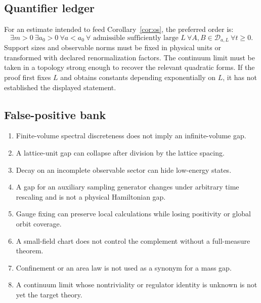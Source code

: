 \normalsize

\subsection{Quantifier ledger}

For an estimate intended to feed Corollary~\ref{cor:os}, the preferred order
is:
\[
 \exists m>0\ \exists a_0>0\
 \forall a<a_0\ \forall\text{ admissible sufficiently large }L\
 \forall A,B\in\mathcal D_{a,L}\ \forall t\geq0.
\]
Support sizes and observable norms must be fixed in physical units or
transformed with declared renormalization factors.  The continuum limit must
be taken in a topology strong enough to recover the relevant quadratic forms.
If the proof first fixes $L$ and obtains constants depending exponentially on
$L$, it has not established the displayed statement.

\subsection{False-positive bank}

\begin{enumerate}[label=(\arabic*),itemsep=2pt]
 \item Finite-volume spectral discreteness does not imply an infinite-volume
 gap.
 \item A lattice-unit gap can collapse after division by the lattice spacing.
 \item Decay on an incomplete observable sector can hide low-energy states.
 \item A gap for an auxiliary sampling generator changes under arbitrary time
 rescaling and is not a physical Hamiltonian gap.
 \item Gauge fixing can preserve local calculations while losing positivity
 or global orbit coverage.
 \item A small-field chart does not control the complement without a
 full-measure theorem.
 \item Confinement or an area law is not used as a synonym for a mass gap.
 \item A continuum limit whose nontriviality or regulator identity is unknown
 is not yet the target theory.
\end{enumerate}
